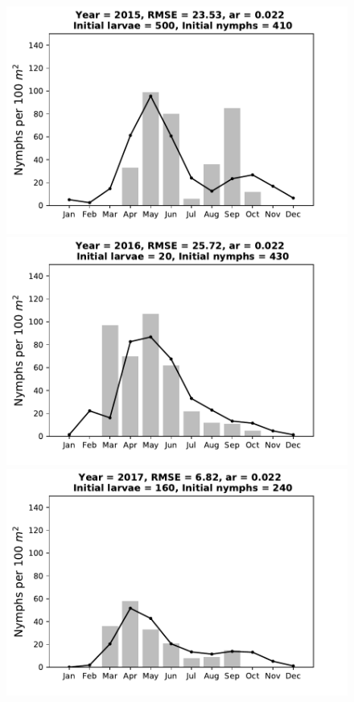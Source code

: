 \documentclass[a4paper, 11pt]{scrartcl}
\begin{document}
\begin{figure}[h!]
\begin{minipage}[c]{0.40\linewidth}
\end{minipage}
\begin{minipage}[c]{0.40\linewidth}
\includegraphics[width=\linewidth]{figures/s3/S3_2015}
\end{minipage}
\begin{minipage}[c]{0.40\linewidth}
\includegraphics[width=\linewidth]{figures/s3/S3_2016}
\end{minipage}
\begin{minipage}[c]{0.40\linewidth}
\includegraphics[width=\linewidth]{figures/s3/S3_2017}

\end{minipage}
\end{figure}
\end{document}
